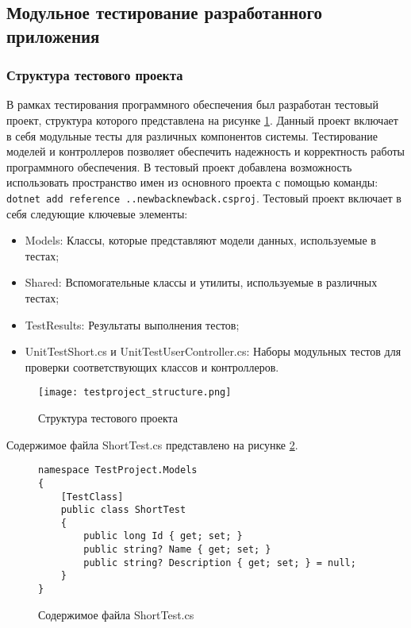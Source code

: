 \renewcommand{\arraystretch}{1.0} %

\subsection{Модульное тестирование разработанного приложения}


\subsubsection{Структура тестового проекта}
В рамках тестирования программного обеспечения был разработан тестовый проект, структура которого представлена на рисунке \ref{testproject_structure:image}. Данный проект включает в себя модульные тесты для различных компонентов системы. Тестирование моделей и контроллеров позволяет обеспечить надежность и корректность работы программного обеспечения.
В тестовый проект добавлена возможность использовать пространство имен из основного проекта с помощью команды: \texttt{dotnet add reference ..\/new\textunderscore back\/new\textunderscore back.csproj}.
Тестовый проект включает в себя следующие ключевые элементы:

\begin{itemize}
  \item Models: Классы, которые представляют модели данных, используемые в тестах;
  \item Shared: Вспомогательные классы и утилиты, используемые в различных тестах;
  \item TestResults: Результаты выполнения тестов;
  \item UnitTestShort.cs и UnitTestUserController.cs: Наборы модульных тестов для проверки соответствующих классов и контроллеров.
\end{itemize}

\begin{figure}[ht]
\centering
\texttt{[image: testproject\_structure.png]}
\caption{Структура тестового проекта}
\label{testproject_structure:image}
\end{figure}

Содержимое файла ShortTest.cs представлено на рисунке \ref{st:image}.

\begin{figure}[!ht]
\lstset{style=sharpc}
\begin{lstlisting}
namespace TestProject.Models
{
    [TestClass]
    public class ShortTest
    {
        public long Id { get; set; }
        public string? Name { get; set; }
        public string? Description { get; set; } = null;
    }
}
\end{lstlisting}
\caption{Содержимое файла ShortTest.cs}
\label{st:image}
\end{figure}

